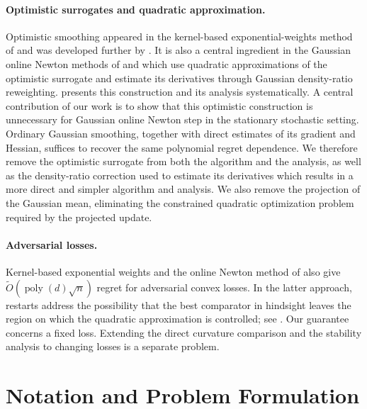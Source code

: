 \documentclass[12pt,cleveref]{jmlr}
\newcommand{\1}{\mathbf 1}
\begin{document}
\paragraph{Optimistic surrogates and quadratic approximation.}
Optimistic smoothing appeared in the kernel-based exponential-weights
method of \citet{bubeck2017kernel} and was developed further by
\citet{lattimore2021improved}. It is also a central ingredient in the
Gaussian online Newton methods of
\citet{lattimore2023second} and \citet{fokkema2024online} which use quadratic
approximations of the optimistic surrogate and estimate its derivatives
through Gaussian density-ratio reweighting.
\citet[Chapter~12]{lattimore2026bandit} presents this construction and
its analysis systematically.
A central contribution of our work is to show that this optimistic
construction is unnecessary for Gaussian online Newton step in the
stationary stochastic setting. Ordinary Gaussian smoothing, together
with direct estimates of its gradient and Hessian, suffices to recover
the same polynomial regret dependence. We therefore remove the
optimistic surrogate from both the algorithm and the analysis, as well
as the density-ratio correction used to estimate its derivatives which
results in a more direct and simpler algorithm and analysis.
We also remove the projection of the Gaussian mean, eliminating the
constrained quadratic optimization problem required by the projected
update.

\paragraph{Adversarial losses.}
Kernel-based exponential weights \citep{bubeck2017kernel} and the online Newton
method of \citet{fokkema2024online} also give
$\widetilde O(\operatorname{poly}(d)\sqrt n)$ regret for adversarial convex
losses. In the latter approach, restarts address the possibility that the
best comparator in hindsight leaves the region on which the quadratic
approximation is controlled; see
\citet[Chapter~11]{lattimore2026bandit}.
Our guarantee concerns a fixed loss. Extending the direct curvature
comparison and the stability analysis to changing losses is a separate
problem.

\section{Notation and Problem Formulation}
\label{sec:setting}
\end{document}
